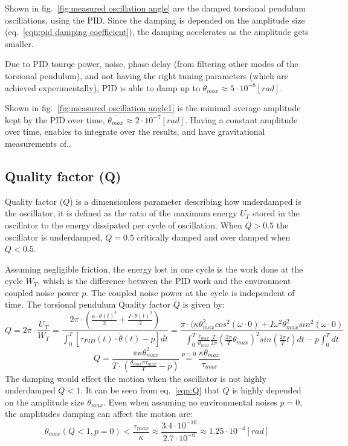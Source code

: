 \documentclass[\main/master.tex]{subfiles}
\begin{document}
Shown in fig.~\ref{fig:measured oscillation angle} are the damped torsional pendulum oscillations, using the PID. Since the damping is depended on the amplitude size (eq.~\ref{eqn:pid damping coefficient}), the damping accelerates as the amplitude gets smaller. 
\par\noindent
Due to PID tourqe power, noise, phase delay (from filtering other modes of the torsional pendulum), and not having the right tuning parameters (which are achieved experimentally), PID is able to damp up to $\theta_{max}\approx 5\cdot 10^{-8}[rad]$.
\par\noindent
Shown in fig.~\ref{fig:measured oscillation angle1} is the minimal average amplitude kept by the PID over time, $\overline{\theta_{max}}\approx 2\cdot 10^{-7}[rad]$. Having a constant amplitude over time, enables to integrate over the results, and have gravitational measurements of..
\par\noindent
\subsection{Quality factor (Q)}
Quality factor ($Q$) is a dimensionless parameter describing how underdamped is the oscillator, it is defined as the ratio of the maximum energy $U_T$ stored in the oscillator to the energy dissipated per cycle of oscillation. When $Q > 0.5$ the oscillator is underdamped, $Q = 0.5$ critically damped and over damped when $Q < 0.5$.
\par\noindent
Assuming negligible friction, the energy lost in one cycle is the work done at the cycle $W_T$, which is the difference between the PID work and the environment coupled noise power $p$. The coupled noise power at the cycle is independent of time. The torsional pendulum Quality factor $Q$ is given by:
\begin{equation}
Q = 2\pi\cdot \frac{U_T}{W_T}=  \frac{2\pi\cdot(\frac{\kappa\cdot\theta(t)^2}{2}+\frac{I\cdot\dot{\theta}(t)^2}{2})}{\int_0^T[\tau_{PID}(t)\cdot\dot{\theta}(t) - p]dt} =  \frac{\pi\cdot(\kappa\theta_{max}^2cos^2(\omega\cdot 0)+I\omega^2\theta_{max}^2sin^2(\omega\cdot 0) }{\int_0^T\frac{\tau_{max} }{\theta_{max}} \frac{ T}{2\pi}(\frac{2\pi}{T}\theta_{max})^2 sin(\frac{2\pi}{T}t)dt-p\int_0^T dt }
\label{eqn:Q}
\end{equation}
\begin{equation}
Q =  \frac{\pi\kappa\theta_{max}^2}{T\cdot(\frac{\theta_{max}\pi\tau_{max}}{T} -p)} \stackrel{p= 0}{=} \frac{\kappa\theta_{max}}{\tau_{max}}
\label{eqn:Q}
\end{equation}
The damping would effect the motion when the oscillator is not highly underdamped $Q < 1$. It can be seen from eq.~\ref{eqn:Q} that $Q$ is highly depended on the amplitude size $\theta_{max}$. Even when assuming no environmental noises $p=0$, the amplitudes damping can affect the motion are:  
\begin{equation}
\theta_{max}(Q<1,p=0) < \frac{\tau_{max}}{\kappa} \approx \frac{3.4\cdot 10^{-10}}{2.7\cdot 10^{-6}} \approx 1.25\cdot 10^{-4} [rad]
\label{eqn:low Q}
\end{equation}
\end{document}
